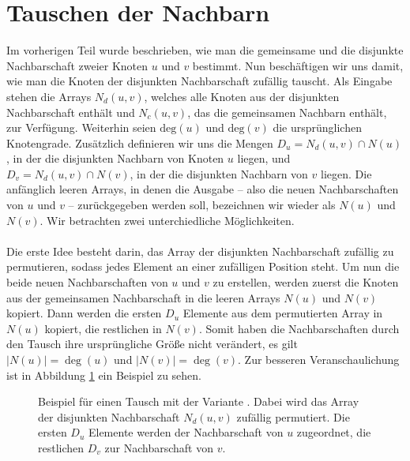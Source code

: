 \section{Tauschen der Nachbarn}
\label{sec:trade}
Im vorherigen Teil wurde beschrieben, wie man die gemeinsame und die disjunkte Nachbarschaft zweier Knoten
$u$ und $v$ bestimmt. Nun beschäftigen wir uns damit, wie man die Knoten der disjunkten Nachbarschaft zufällig tauscht. Als Eingabe 
stehen die Arrays $N_{d}(u,v)$, welches alle Knoten aus der disjunkten Nachbarschaft enthält
und $N_{c}(u,v)$, das die gemeinsamen Nachbarn enthält, zur Verfügung. Weiterhin seien $\text{deg}(u)$ und
$\text{deg}(v)$ die ursprünglichen Knotengrade. Zusätzlich definieren wir uns die Mengen
$D_{u} = N_{d}(u,v) \cap N(u)$, in der die disjunkten Nachbarn von Knoten $u$ liegen, 
und $D_{v} = N_{d}(u,v) \cap N(v)$, in der die disjunkten Nachbarn von $v$ liegen. Die anfänglich
leeren Arrays, in denen die Ausgabe -- also die neuen Nachbarschaften von $u$ und $v$ -- zurückgegeben 
werden soll, bezeichnen wir wieder als $N(u)$ und $N(v)$.
Wir betrachten zwei unterchiedliche Möglichkeiten.
\\
\\
Die erste Idee besteht darin,  
das Array der disjunkten Nachbarschaft zufällig zu permutieren, sodass jedes Element an 
einer zufälligen Position steht. Um nun die beide \glqq neuen\grqq{} Nachbarschaften von $u$ und $v$ zu erstellen,
werden zuerst die Knoten aus der gemeinsamen Nachbarschaft in die leeren Arrays $N(u)$ und $N(v)$ kopiert.
Dann werden die ersten $D_{u}$ Elemente aus dem permutierten Array in $N(u)$ kopiert, die restlichen
in $N(v)$. Somit haben die Nachbarschaften durch den Tausch ihre ursprüngliche Größe nicht verändert, es gilt $|N(u)| = \deg(u)$ und
$|N(v)| = \deg(v)$.
Zur besseren Veranschaulichung ist in Abbildung \ref{fig:trade_shuffle} ein Beispiel zu sehen.
\begin{figure}
\centering
  \caption{Beispiel für einen Tausch mit der Variante \perm. Dabei wird das Array der 
  disjunkten Nachbarschaft $N_{d}(u,v)$ zufällig permutiert. Die ersten $D_{u}$ Elemente werden der Nachbarschaft
  von $u$ zugeordnet, die restlichen $D_{v}$ zur Nachbarschaft von $v$. }
  \label{fig:trade_shuffle}
\end{figure}
